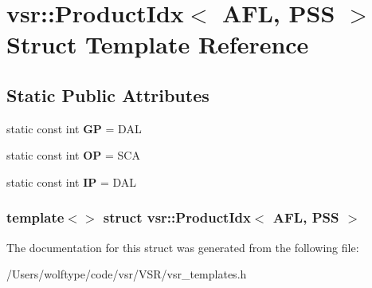 \hypertarget{structvsr_1_1_product_idx_3_01_a_f_l_00_01_p_s_s_01_4}{\section{vsr\-:\-:Product\-Idx$<$ A\-F\-L, P\-S\-S $>$ Struct Template Reference}
\label{structvsr_1_1_product_idx_3_01_a_f_l_00_01_p_s_s_01_4}
}
\subsection*{Static Public Attributes}
\begin{DoxyCompactItemize}
\item 
\hypertarget{structvsr_1_1_product_idx_3_01_a_f_l_00_01_p_s_s_01_4_a8afc2f5b25dd9acfc0336ef96968ffe7}{static const int {\bfseries G\-P} = D\-A\-L}\label{structvsr_1_1_product_idx_3_01_a_f_l_00_01_p_s_s_01_4_a8afc2f5b25dd9acfc0336ef96968ffe7}

\item 
\hypertarget{structvsr_1_1_product_idx_3_01_a_f_l_00_01_p_s_s_01_4_ae7b2705dadfc31b89b086424aaa2acb1}{static const int {\bfseries O\-P} = S\-C\-A}\label{structvsr_1_1_product_idx_3_01_a_f_l_00_01_p_s_s_01_4_ae7b2705dadfc31b89b086424aaa2acb1}

\item 
\hypertarget{structvsr_1_1_product_idx_3_01_a_f_l_00_01_p_s_s_01_4_a1f4ee933efae9f056c0efe5441e4acf9}{static const int {\bfseries I\-P} = D\-A\-L}\label{structvsr_1_1_product_idx_3_01_a_f_l_00_01_p_s_s_01_4_a1f4ee933efae9f056c0efe5441e4acf9}

\end{DoxyCompactItemize}
\subsubsection*{template$<$$>$ struct vsr\-::\-Product\-Idx$<$ A\-F\-L, P\-S\-S $>$}



The documentation for this struct was generated from the following file\-:\begin{DoxyCompactItemize}
\item 
/\-Users/wolftype/code/vsr/\-V\-S\-R/vsr\-\_\-templates.\-h\end{DoxyCompactItemize}
